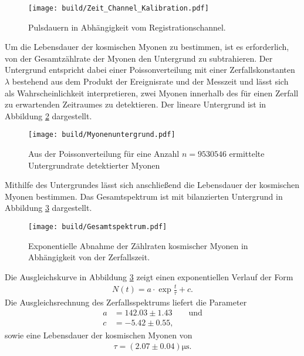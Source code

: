 \FloatBarrier
\begin{figure}
  \centering
  \texttt{[image: build/Zeit\_Channel\_Kalibration.pdf]}
  \caption{Pulsdauern in Abhängigkeit vom Registrationschannel.}
  \label{fig:06}
\end{figure}
\FloatBarrier
\noindent Um die Lebensdauer der kosmischen Myonen zu bestimmen, ist es
erforderlich, von der Gesamtzählrate der Myonen den Untergrund zu subtrahieren.
Der Untergrund entspricht dabei einer Poissonverteilung mit einer
Zerfallskonstanten $\lambda$ bestehend aus dem Produkt der Ereignisrate und der
Messzeit und lässt sich als Wahrscheinlichkeit interpretieren, zwei Myonen
innerhalb des für einen Zerfall zu erwartenden Zeitraumes zu detektieren. Der
lineare Untergrund ist in Abbildung \ref{fig:07} dargestellt.  \\
\FloatBarrier
\begin{figure}
  \centering
  \texttt{[image: build/Myonenuntergrund.pdf]}
  \caption{Aus der Poissonverteilung für eine Anzahl $n = 9530546$ ermittelte
  Untergrundrate detektierter Myonen}
  \label{fig:07}
\end{figure}
\FloatBarrier
\noindent Mithilfe des Untergrundes lässt sich anschließend die Lebensdauer der
kosmischen Myonen bestimmen. Das Gesamtspektrum ist mit bilanzierten Untergrund
in Abbildung \ref{fig:08} dargestellt. \\
\FloatBarrier
\begin{figure}
  \centering
  \texttt{[image: build/Gesamtspektrum.pdf]}
  \caption{Exponentielle Abnahme der Zählraten kosmischer Myonen in Abhängigkeit
  von der Zerfallszeit.}
  \label{fig:08}
\end{figure}
\FloatBarrier
\noindent Die Ausgleichskurve in Abbildung \ref{fig:08} zeigt einen
exponentiellen Verlauf der Form
\begin{align}
  N(t) = a \cdot \exp{\frac{t}{\tau}} + c.
  \label{eqn:09}
\end{align}
\noindent Die Ausgleichsrechnung des Zerfallsspektrums liefert die Parameter
\begin{align*}
  a &= 142.03 \pm 1.43 \qquad \text{und} \\
  c &= -5.42 \pm 0.55,
\end{align*}
\noindent sowie eine Lebensdauer der kosmischen Myonen von
\begin{align*}
  \tau = (2.07 \pm 0.04) \si{\micro\second}.
\end{align*}
